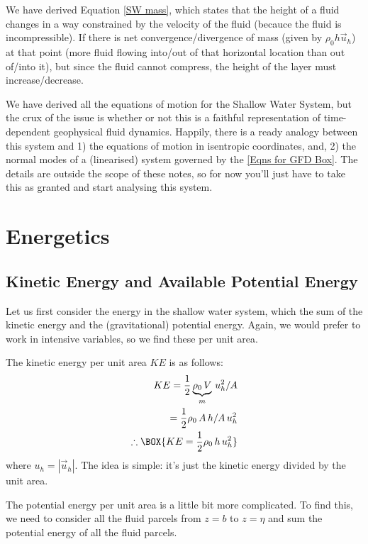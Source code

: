 We have derived Equation \ref{SW mass}, which states that the height of a fluid changes in a way constrained by the velocity of the fluid (becauce the fluid is incompressible). If there is net convergence/divergence of mass (given by \(\rho_0 h \vec{u}_h\)) at that point (more fluid flowing into/out of that horizontal location than out of/into it), but since the fluid cannot compress, the height of the layer must increase/decrease.

We have derived all the equations of motion for the Shallow Water System, but the crux of the issue is whether or not this is a faithful representation of time-dependent geophysical fluid dynamics. Happily, there is a ready analogy between this system and 1) the equations of motion in isentropic coordinates, and, 2) the normal modes of a (linearised) system governed by the \ref{Eqns for GFD Box}. The details are outside the scope of these notes, so for now you'll just have to take this as granted and start analysing this system.

\section{Energetics}

\subsection{Kinetic Energy and Available Potential Energy}\label{s SW energy}

Let us first consider the energy in the shallow water system, which the sum of the kinetic energy and the (gravitational) potential energy. Again, we would prefer to work in intensive variables, so we find these per unit area.

The kinetic energy per unit area \(KE\) is as follows:
\begin{align*}
    KE = \frac{1}{2}\underbrace{\rho_0\,V}_{m}\,u_h^2/A\\
    =\frac{1}{2}\rho_0\,A\,h/A\,u_h^2\\
    \therefore\BOX{KE = \frac{1}{2}\rho_0\,h\,u_h^2}
\end{align*}
where \(u_h=|\vec{u}_h|\). The idea is simple: it's just the kinetic energy divided by the unit area.

The potential energy per unit area is a little bit more complicated. To find this, we need to consider all the fluid parcels from \(z=b\) to \(z=\eta\) and sum the potential energy of all the fluid parcels.

